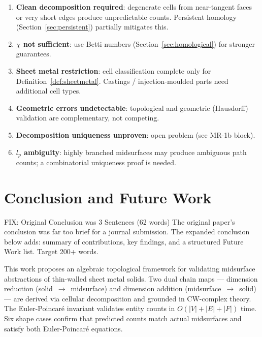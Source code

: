 \documentclass[journal,twocolumn,10pt]{IEEEtran}
\newcommand{\Euler}{\chi}
\begin{document}
\begin{enumerate}[noitemsep,topsep=2pt]
\item \textbf{Clean decomposition required}: degenerate cells from near-tangent
      faces or very short edges produce unpredictable counts. Persistent
      homology (Section~\ref{sec:persistent}) partially mitigates this.
\item \textbf{$\Euler$ not sufficient}: use Betti numbers
      (Section~\ref{sec:homological}) for stronger guarantees.
\item \textbf{Sheet metal restriction}: cell classification complete only for
      Definition~\ref{def:sheetmetal}. Castings / injection-moulded parts need
      additional cell types.
\item \textbf{Geometric errors undetectable}: topological and geometric
      (Hausdorff) validation are complementary, not competing.
\item \textbf{Decomposition uniqueness unproven}: open problem
      (see MR-1b block).
\item \textbf{$l_p$ ambiguity}: highly branched midsurfaces may produce
      ambiguous path counts; a combinatorial uniqueness proof is needed.
\end{enumerate}

\section{Conclusion and Future Work}\label{sec:conclusion}

\begin{fixblock}{FIX: Original Conclusion was 3 Sentences (62 words)}
The original paper's conclusion was far too brief for a journal submission.
The expanded conclusion below adds: summary of contributions, key findings,
and a structured Future Work list. Target 200+ words.
\end{fixblock}

This work proposes an algebraic topological framework for validating
midsurface abstractions of thin-walled sheet metal solids. Two dual chain
maps --- dimension reduction (solid~$\to$~midsurface) and dimension addition
(midsurface~$\to$~solid) --- are derived via cellular decomposition and
grounded in CW-complex theory. The Euler-Poincar\'e invariant validates
entity counts in $O(|V|+|E|+|F|)$ time. Six shape cases confirm that
predicted counts match actual midsurfaces and satisfy both Euler-Poincar\'e
equations.
\end{document}
